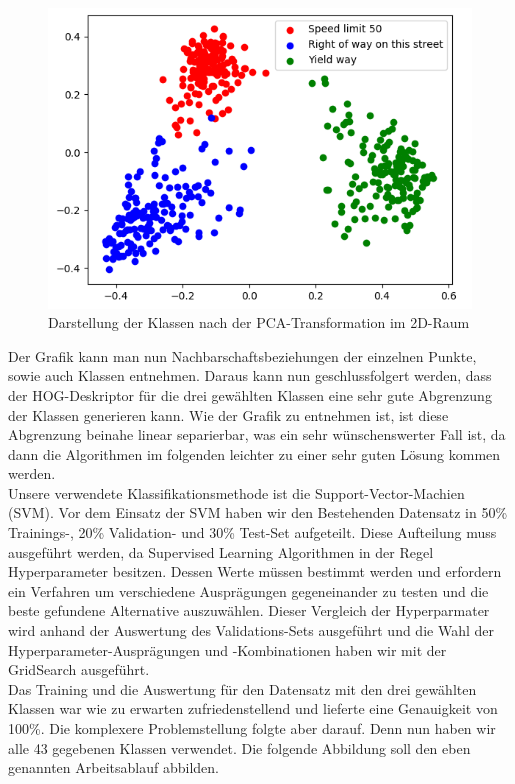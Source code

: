 \begin{figure}[h]
\centering
\includegraphics[scale=0.75]{./bilder/3_classes_pca.png}
\caption{Darstellung der Klassen nach der PCA-Transformation im 2D-Raum}
\end{figure}

Der Grafik kann man nun Nachbarschaftsbeziehungen der einzelnen Punkte, sowie auch Klassen entnehmen.
Daraus kann nun geschlussfolgert werden, dass der HOG-Deskriptor für die drei gewählten Klassen eine sehr gute Abgrenzung der Klassen generieren kann. Wie der Grafik zu entnehmen ist, ist diese Abgrenzung beinahe linear separierbar, was ein sehr wünschenswerter Fall ist, da dann die Algorithmen im folgenden leichter zu einer sehr guten Lösung kommen werden.\\

Unsere verwendete Klassifikationsmethode ist die Support-Vector-Machien (SVM). 
Vor dem Einsatz der SVM haben wir den Bestehenden Datensatz in 50\% Trainings-, 20\% Validation- und 30\% Test-Set aufgeteilt. Diese Aufteilung muss ausgeführt werden, da Supervised Learning Algorithmen in der Regel Hyperparameter besitzen. Dessen Werte müssen bestimmt werden und erfordern ein Verfahren um verschiedene Ausprägungen gegeneinander zu testen und die beste gefundene Alternative auszuwählen. Dieser Vergleich der Hyperparmater wird anhand der Auswertung des Validations-Sets ausgeführt und die Wahl der Hyperparameter-Ausprägungen und -Kombinationen haben wir mit der GridSearch ausgeführt.\\

Das Training und die Auswertung für den Datensatz mit den drei gewählten Klassen war wie zu erwarten zufriedenstellend und lieferte eine Genauigkeit von 100\%.
Die komplexere Problemstellung folgte aber darauf. Denn nun haben wir alle 43 gegebenen Klassen verwendet. Die folgende Abbildung soll den eben genannten Arbeitsablauf abbilden.\\

